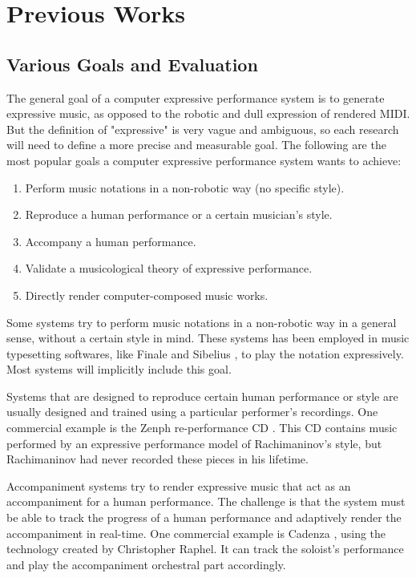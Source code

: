 \chapter{Previous Works}
\label{chap:prev}
\section{Various Goals and Evaluation}
The general goal of a computer expressive performance system is to generate expressive music, as opposed to the robotic and dull expression of rendered MIDI. But the definition of "expressive" is very vague and ambiguous, so each research will need to define a more precise and measurable goal. The following are the most popular goals a computer expressive performance system wants to achieve:
\begin{enumerate}
   \item Perform music notations in a non-robotic way (no specific style).
   \item Reproduce a human performance or a certain musician's style.
   \item Accompany a human performance.
   \item Validate a musicological theory of expressive performance.
   \item Directly render computer-composed music works.
\end{enumerate}

Some systems try to perform music notations in a non-robotic way in a general sense, without a certain style in mind. These systems has been employed in music typesetting softwares, like Finale \cite{finale} and Sibelius \cite{sibelius}, to play the notation expressively. Most systems will implicitly include this goal.

Systems that are designed to reproduce certain human performance or style are usually designed and trained using a particular performer's recordings. One commercial example is the Zenph re-performance CD \cite{zenph}. This CD contains music performed by an expressive performance model of Rachimaninov's style, but Rachimaninov had never recorded these pieces in his lifetime. 


Accompaniment systems try to render expressive music that act as an accompaniment for a human performance. The challenge is that the system must be able to track the progress of a human performance and adaptively render the accompaniment in real-time. One commercial example is Cadenza \cite{cadenza}, using the technology created by Christopher Raphel. It can track the soloist's performance and play the accompaniment orchestral part accordingly.


